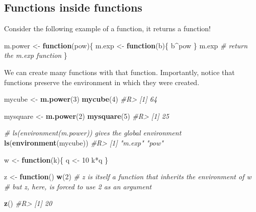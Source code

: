 \documentclass[]{book}
\newenvironment{Shaded}{}{}
\newcommand{\CommentTok}[1]{\textcolor[rgb]{0.38,0.63,0.69}{\textit{#1}}}
\newcommand{\ControlFlowTok}[1]{\textcolor[rgb]{0.00,0.44,0.13}{\textbf{#1}}}
\newcommand{\DecValTok}[1]{\textcolor[rgb]{0.25,0.63,0.44}{#1}}
\newcommand{\KeywordTok}[1]{\textcolor[rgb]{0.00,0.44,0.13}{\textbf{#1}}}
\newcommand{\NormalTok}[1]{#1}
\newcommand{\OperatorTok}[1]{\textcolor[rgb]{0.40,0.40,0.40}{#1}}
\newcommand{\StringTok}[1]{\textcolor[rgb]{0.25,0.44,0.63}{#1}}
\theoremstyle{definition}
\theoremstyle{definition}
\theoremstyle{definition}
\theoremstyle{remark}
\begin{document}
\hypertarget{functions-inside-functions}{%
\subsection{Functions inside
functions}\label{functions-inside-functions}}

Consider the following example of a function, it returns a function!

\begin{Shaded}
\begin{Highlighting}[]
\NormalTok{m.power <-}\StringTok{ }\ControlFlowTok{function}\NormalTok{(pow)\{}
\NormalTok{  m.exp <-}\StringTok{ }\ControlFlowTok{function}\NormalTok{(b)\{ b}\OperatorTok{^}\NormalTok{pow \}}
\NormalTok{  m.exp }\CommentTok{# return the m.exp function}
\NormalTok{\}}
\end{Highlighting}
\end{Shaded}

We can create many functions with that function. Importantly, notice
that functions preserve the environment in which they were created.

\begin{Shaded}
\begin{Highlighting}[]

\NormalTok{mycube <-}\StringTok{ }\KeywordTok{m.power}\NormalTok{(}\DecValTok{3}\NormalTok{)}
\KeywordTok{mycube}\NormalTok{(}\DecValTok{4}\NormalTok{)}
\CommentTok{#R> [1] 64}

\NormalTok{mysquare <-}\StringTok{ }\KeywordTok{m.power}\NormalTok{(}\DecValTok{2}\NormalTok{)}
\KeywordTok{mysquare}\NormalTok{(}\DecValTok{5}\NormalTok{)}
\CommentTok{#R> [1] 25}

\CommentTok{# ls(environment(m.power)) gives the global environment}
\KeywordTok{ls}\NormalTok{(}\KeywordTok{environment}\NormalTok{(mycube)) }
\CommentTok{#R> [1] "m.exp" "pow"}

\NormalTok{w <-}\StringTok{ }\ControlFlowTok{function}\NormalTok{(k)\{}
\NormalTok{  q <-}\StringTok{ }\DecValTok{10}
\NormalTok{  k}\OperatorTok{*}\NormalTok{q}
\NormalTok{\}}

\NormalTok{z <-}\StringTok{ }\ControlFlowTok{function}\NormalTok{() }\KeywordTok{w}\NormalTok{(}\DecValTok{2}\NormalTok{) }\CommentTok{# z is itself a function that inherits the environment of w}
\CommentTok{# but z, here, is forced to use 2 as an argument }

\KeywordTok{z}\NormalTok{()}
\CommentTok{#R> [1] 20}
\end{Highlighting}
\end{Shaded}
\end{document}
